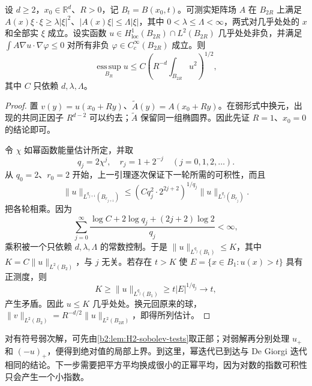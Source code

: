 \begin{theorem}[正幂迭代的局部上界]
\label{b2:thm:H2-moser-upper}
设 \(d\geq2\)，\(x_0\in\mathbb R^d\)、\(R>0\)，记 \(B_t=B(x_0,t)\)。可测实矩阵场 \(A\) 在 \(B_{2R}\) 上满足
\(A(x)\xi\cdot\xi\geq\lambda|\xi|^2\)、\(|A(x)\xi|\leq\Lambda|\xi|\)，其中 \(0<\lambda\leq\Lambda<\infty\)，两式对几乎处处的 \(x\) 和全部实 \(\xi\) 成立。设实函数 \(u\in H^1_{\mathrm{loc}}(B_{2R})\cap L^2(B_{2R})\) 几乎处处非负，并满足
\(\int A\nabla u\cdot\nabla\varphi\leq0\) 对所有非负 \(\varphi\in C_c^\infty(B_{2R})\) 成立。则
\[
 \operatorname*{ess\,sup}_{B_R}u
 \leq C\left(R^{-d}\int_{B_{2R}}u^2\right)^{1/2},
\]
其中 \(C\) 只依赖 \(d,\lambda,\Lambda\)。
\end{theorem}
\begin{proof}
置 \(v(y)=u(x_0+Ry)\)、\(\widetilde A(y)=A(x_0+Ry)\)。在弱形式中换元，出现的共同正因子 \(R^{d-2}\) 可以约去；\(\widetilde A\) 保留同一组椭圆界。因此先证 \(R=1\)、\(x_0=0\) 的结论即可。

令 \(\chi\) 如幂函数能量估计所定，并取
\[
 q_j=2\chi^j,
 \quad r_j=1+2^{-j}
 \quad(j=0,1,2,\ldots).
\]
从 \(q_0=2\)、\(r_0=2\) 开始，上一引理逐次保证下一轮所需的可积性，而且
\[
 \|u\|_{L^{q_{j+1}}(B_{r_{j+1}})}
 \leq\left(Cq_j^2\cdot2^{2j+2}\right)^{1/q_j}
          \|u\|_{L^{q_j}(B_{r_j})}.
\]
把各轮相乘。因为
\[
 \sum_{j=0}^\infty
 \frac{\log C+2\log q_j+(2j+2)\log2}{q_j}<\infty,
\]
乘积被一个只依赖 \(d,\lambda,\Lambda\) 的常数控制。于是
\(\|u\|_{L^{q_j}(B_1)}\leq K\)，其中 \(K=C\|u\|_{L^2(B_2)}\)，与 \(j\) 无关。若存在 \(t>K\) 使 \(E=\{x\in B_1:u(x)>t\}\) 具有正测度，则
\[
 K\geq\|u\|_{L^{q_j}(B_1)}\geq t|E|^{1/q_j}
 \longrightarrow t,
\]
产生矛盾。因此 \(u\leq K\) 几乎处处。换元回原来的球，
\(\|v\|_{L^2(B_2)}=R^{-d/2}\|u\|_{L^2(B_{2R})}\)，即得所列估计。
\end{proof}

对有符号弱次解，可先由\cref{b2:lem:H2-sobolev-tests}取正部；对弱解再分别处理 \(u_+\) 和 \((-u)_+\)，便得到绝对值的局部上界。到这里，幂迭代已到达与 De Giorgi 迭代相同的结论。下一步需要把平方平均换成很小的正幂平均，因为对数的指数可积性只会产生一个小指数。

